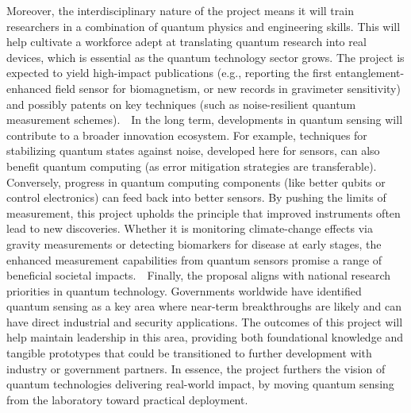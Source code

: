 \documentclass[12pt]{article}
\begin{document}
Moreover, the interdisciplinary nature of the project means it will
train researchers in a combination of quantum physics and engineering
skills. This will help cultivate a workforce adept at translating
quantum research into real devices, which is essential as the quantum
technology sector grows. The project is expected to yield high-impact
publications (e.g., reporting the first entanglement-enhanced field
sensor for biomagnetism, or new records in gravimeter sensitivity) and
possibly patents on key techniques (such as noise-resilient quantum
measurement schemes).    In the long term, developments in quantum
sensing will contribute to a broader innovation ecosystem. For
example, techniques for stabilizing quantum states against noise,
developed here for sensors, can also benefit quantum computing (as
error mitigation strategies are transferable). Conversely, progress in
quantum computing components (like better qubits or control
electronics) can feed back into better sensors. By pushing the limits
of measurement, this project upholds the principle that improved
instruments often lead to new discoveries. Whether it is monitoring
climate-change effects via gravity measurements or detecting
biomarkers for disease at early stages, the enhanced measurement
capabilities from quantum sensors promise a range of beneficial
societal impacts.    Finally, the proposal aligns with national
research priorities in quantum technology. Governments worldwide have
identified quantum sensing as a key area where near-term breakthroughs
are likely and can have direct industrial and security
applications. The outcomes of this project will help maintain
leadership in this area, providing both foundational knowledge and
tangible prototypes that could be transitioned to further development
with industry or government partners. In essence, the project furthers
the vision of quantum technologies delivering real-world impact, by
moving quantum sensing from the laboratory toward practical
deployment.   
\end{document}
